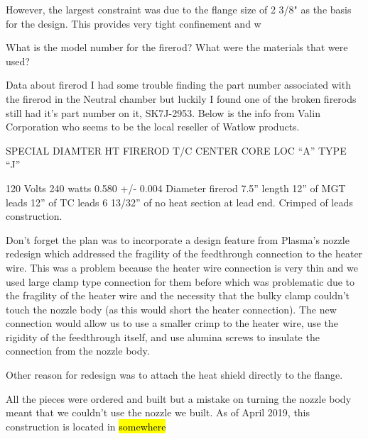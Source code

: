 However, the largest constraint was due to the flange size of 2 3/8" as the basis for the design. This provides very tight confinement and w

What is the model number for the firerod? What were the materials that were used? 


Data about firerod
I had some trouble finding the part number associated with the firerod in the Neutral chamber but luckily I found one of the broken firerods still had it's part number on it, SK7J-2953. 
Below is the info from Valin Corporation who seems to be the local reseller of Watlow products.

SPECIAL DIAMTER
HT FIREROD   
T/C CENTER CORE LOC “A” TYPE “J”
 
120 Volts
240 watts
0.580 +/- 0.004 Diameter firerod
7.5” length
12” of MGT leads
12” of TC leads
6 13/32” of no heat section at lead end.
Crimped of leads construction.

Don't forget the plan was to incorporate a design feature from Plasma's nozzle redesign which addressed the fragility of the feedthrough connection to the heater wire. This was a problem because the heater wire connection is very thin and we used large clamp type connection for them before which was problematic due to the fragility of the heater wire and the necessity that the bulky clamp couldn't touch the nozzle body (as this would short the heater connection). The new connection would allow us to use a smaller crimp to the heater wire, use the rigidity of the feedthrough itself, and use alumina screws to insulate the connection from the nozzle body.

Other reason for redesign was to attach the heat shield directly to the flange.

All the pieces were ordered and built but a mistake on turning the nozzle body meant that we couldn't use the nozzle we built. As of April 2019, this construction is located in \hl{somewhere}
